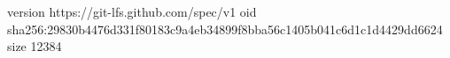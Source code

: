 version https://git-lfs.github.com/spec/v1
oid sha256:29830b4476d331f80183c9a4eb34899f8bba56c1405b041c6d1c1d4429dd6624
size 12384
